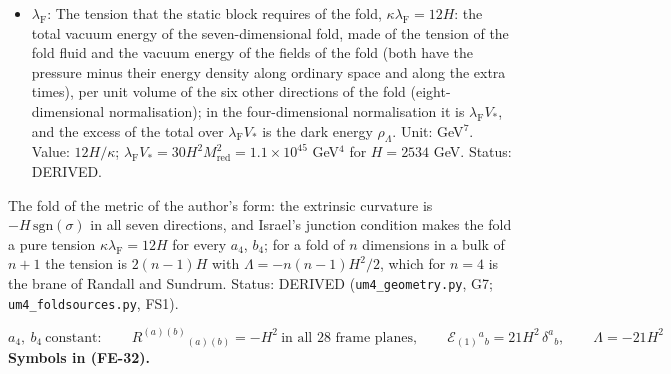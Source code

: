 \documentclass[
  10pt,
]{article}
\begin{document}
\begin{itemize}
  energy density, \(\mathcal{S}^1{}_1\) and \(\mathcal{S}^5{}_5\) its
  pressures along ordinary space and along the extra times (frame
  components along the fold, eight-dimensional normalisation: an energy
  per unit volume of the six other directions of the fold). Unit:
  GeV\(^7\). Value: \(\kappa\mathcal{S}^a{}_b = -12H\delta^a{}_b\) for
  every \(a_4\), \(b_4\) of the author's form. Status: DERIVED.
\item
  \(\lambda_{\mathrm{F}}\): The tension that the static block requires
  of the fold, \(\kappa\lambda_{\mathrm{F}} = 12H\): the total vacuum
  energy of the seven-dimensional fold, made of the tension of the fold
  fluid and the vacuum energy of the fields of the fold (both have the
  pressure minus their energy density along ordinary space and along the
  extra times), per unit volume of the six other directions of the fold
  (eight-dimensional normalisation); in the four-dimensional
  normalisation it is \(\lambda_{\mathrm{F}}V_*\), and the excess of the
  total over \(\lambda_{\mathrm{F}}V_*\) is the dark energy
  \(\rho_\Lambda\). Unit: GeV\(^7\). Value: \(12H/\kappa\);
  \(\lambda_{\mathrm{F}}V_* = 30H^2M_{\mathrm{red}}^2 = 1.1\times10^{45}\)
  GeV\(^4\) for \(H = 2534\) GeV. Status: DERIVED.
\end{itemize}

The fold of the metric of the author's form: the extrinsic curvature is
\(-H\,\mathrm{sgn}(\sigma)\) in all seven directions, and Israel's
junction condition makes the fold a pure tension
\(\kappa\lambda_{\mathrm{F}} = 12H\) for every \(a_4\), \(b_4\); for a
fold of \(n\) dimensions in a bulk of \(n + 1\) the tension is
\(2(n - 1)H\) with \(\Lambda = -n(n - 1)H^2/2\), which for \(n = 4\) is
the brane of Randall and Sundrum. Status: DERIVED
(\texttt{um4\_geometry.py}, G7; \texttt{um4\_foldsources.py}, FS1).

\[
a_4,\ b_4\ \text{constant}:\qquad R^{(a)(b)}{}_{(a)(b)} = -H^2\ \text{in all 28 frame planes},\qquad
\mathcal{E}_{(1)}{}^a{}_b = 21H^2\,\delta^a{}_b,\qquad \Lambda = -21H^2 \tag{FE-32}
\] \textbf{Symbols in (FE-32).}
\end{document}

